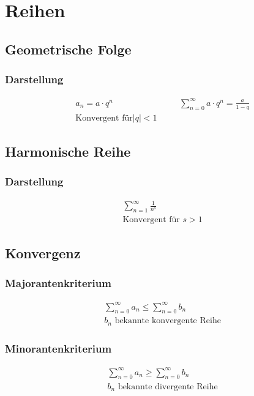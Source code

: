 \section{Reihen}
\subsection{Geometrische Folge}

\subsubsection{Darstellung}

\begin{alignat*}{2}
&a_n = a \cdot q^n &\quad& \sum_{n=0}^\infty a \cdot q^n = \frac{a}{1-q} \\
&\text{Konvergent für} \left| q \right| < 1 
\end{alignat*}

\subsection{Harmonische Reihe}

\subsubsection{Darstellung}

\begin{align*}
&\sum_{n=1}^\infty \frac{1}{n^s} \\
&\text{Konvergent für } s > 1
\end{align*}

\newpage
\subsection{Konvergenz}

\begin{multicols}{2}
\subsubsection{Majorantenkriterium}
\begin{align*}
&\sum_{n=0}^\infty a_n\leq\sum_{n=0}^\infty b_n \\
& b_n \text{ bekannte konvergente Reihe}
\end{align*}

\subsubsection{Minorantenkriterium}
\begin{align*}
&\sum_{n=0}^\infty a_n\geq\sum_{n=0}^\infty b_n \\
& b_n \text{ bekannte divergente Reihe}
\end{align*}
\end{multicols}


